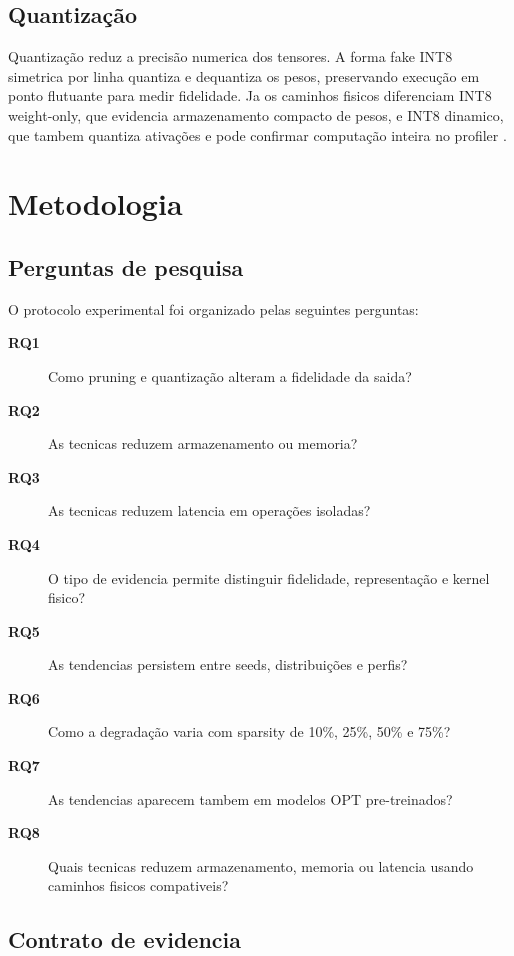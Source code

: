 \documentclass[12pt, a4paper]{article}
\newcommand{\RQ}[1]{\textbf{RQ#1}}
\begin{document}
\subsection{Quantiza\c{c}\~ao}

Quantiza\c{c}\~ao reduz a precis\~ao numerica dos tensores. A forma fake INT8
simetrica por linha quantiza e dequantiza os pesos, preservando execu\c{c}\~ao
em ponto flutuante para medir fidelidade. Ja os caminhos fisicos diferenciam
INT8 weight-only, que evidencia armazenamento compacto de pesos, e INT8
dinamico, que tambem quantiza ativa\c{c}\~oes e pode confirmar computa\c{c}\~ao
inteira no profiler \cite{jacob2018quantization,torchao2026}.

\section{Metodologia}

\subsection{Perguntas de pesquisa}

O protocolo experimental foi organizado pelas seguintes perguntas:

\begin{description}
  \item[\RQ{1}] Como pruning e quantiza\c{c}\~ao alteram a fidelidade da saida?
  \item[\RQ{2}] As tecnicas reduzem armazenamento ou memoria?
  \item[\RQ{3}] As tecnicas reduzem latencia em opera\c{c}\~oes isoladas?
  \item[\RQ{4}] O tipo de evidencia permite distinguir fidelidade, representa\c{c}\~ao e kernel fisico?
  \item[\RQ{5}] As tendencias persistem entre seeds, distribui\c{c}\~oes e perfis?
  \item[\RQ{6}] Como a degrada\c{c}\~ao varia com sparsity de 10\%, 25\%, 50\% e 75\%?
  \item[\RQ{7}] As tendencias aparecem tambem em modelos OPT pre-treinados?
  \item[\RQ{8}] Quais tecnicas reduzem armazenamento, memoria ou latencia usando caminhos fisicos compativeis?
\end{description}

\subsection{Contrato de evidencia}
\end{document}
